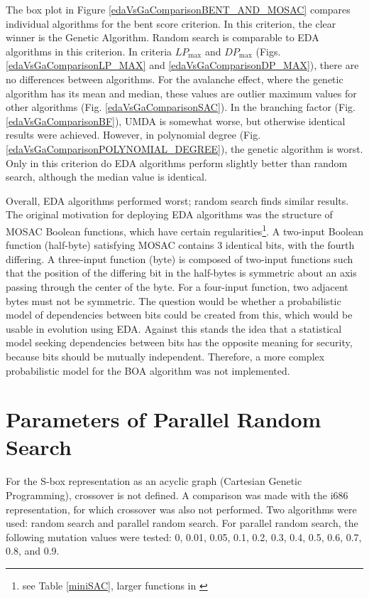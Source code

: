 The box plot in Figure \ref{edaVsGaComparisonBENT_AND_MOSAC} compares individual
algorithms for the bent score criterion. In this criterion, the clear winner is the
Genetic Algorithm. Random search is comparable to EDA algorithms in this criterion.
In criteria $LP_{\max}$ and $DP_{\max}$ (Figs. \ref{edaVsGaComparisonLP_MAX} and \ref{edaVsGaComparisonDP_MAX}),
there are no differences between algorithms. For the avalanche effect, where the genetic algorithm has its mean and median,
these values are outlier maximum values for other algorithms (Fig. \ref{edaVsGaComparisonSAC}).
In the branching factor (Fig. \ref{edaVsGaComparisonBF}), UMDA is somewhat worse, but otherwise
identical results were achieved. However, in polynomial degree (Fig. \ref{edaVsGaComparisonPOLYNOMIAL_DEGREE}), the genetic algorithm is
worst. Only in this criterion do EDA algorithms perform slightly better than random
search, although the median value is identical.

Overall, EDA algorithms performed worst; random search finds similar results.
The original motivation for deploying EDA algorithms
was the structure of MOSAC Boolean functions, which have certain
regularities\footnote{see Table \ref{miniSAC}, larger functions in \cite{yokohama}}.
A two-input Boolean function (half-byte) satisfying MOSAC contains 3 identical bits, with the fourth differing.
A three-input function (byte) is composed of two-input functions such that the position of the differing bit in the half-bytes is symmetric
about an axis passing through the center of the byte. For a four-input function, two adjacent bytes must not be symmetric.
The question would be whether a probabilistic model of dependencies between bits could be created from this,
which would be usable in evolution using EDA. Against this stands the idea that
a statistical model seeking dependencies between bits has the opposite meaning for security,
because bits should be mutually independent. Therefore, a
more complex probabilistic model for the BOA algorithm was not implemented.

\section{Parameters of Parallel Random Search}\label{secParalelRandomComparison}
For the S-box representation as an acyclic graph (Cartesian Genetic Programming), crossover is not defined.
A comparison was made with the i686 representation, for which crossover was also not performed.
Two algorithms were used: random search and parallel random search.
For parallel random search, the following mutation values were tested:
0, 0.01, 0.05, 0.1, 0.2, 0.3, 0.4, 0.5, 0.6, 0.7, 0.8, and 0.9.

